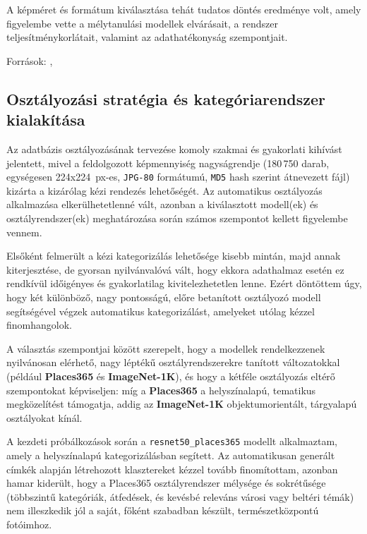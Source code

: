             A képméret és formátum kiválasztása tehát tudatos döntés eredménye volt, amely figyelembe vette a mélytanulási modellek elvárásait, a rendszer teljesítménykorlátait, valamint az adathatékonyság szempontjait.
            
            \begin{flushright}
            \small
            Források: \cite{article_Size_Matters_for_CNN_Classifiers}, \cite{article_Learning_to_Resize_Images_for_Computer_Vision_Tasks}
            \end{flushright}
   
        \subsection{Osztályozási stratégia és kategóriarendszer kialakítása}

            Az adatbázis osztályozásának tervezése komoly szakmai és gyakorlati kihívást jelentett, mivel a feldolgozott képmennyiség nagyságrendje (180\,750 darab, egységesen 224x224~px-es, \texttt{JPG-80} formátumú, \texttt{MD5} hash szerint átnevezett fájl) kizárta a kizárólag kézi rendezés lehetőségét. Az automatikus osztályozás alkalmazása elkerülhetetlenné vált, azonban a kiválasztott modell(ek) és osztályrendszer(ek) meghatározása során számos szempontot kellett figyelembe vennem.
            
            Elsőként felmerült a kézi kategorizálás lehetősége kisebb mintán, majd annak kiterjesztése, de gyorsan nyilvánvalóvá vált, hogy ekkora adathalmaz esetén ez rendkívül időigényes és gyakorlatilag kivitelezhetetlen lenne. Ezért döntöttem úgy, hogy két különböző, nagy pontosságú, előre betanított osztályozó modell segítségével végzek automatikus kategorizálást, amelyeket utólag kézzel finomhangolok. 
            
            A választás szempontjai között szerepelt, hogy a modellek rendelkezzenek nyilvánosan elérhető, nagy léptékű osztályrendszerekre tanított változatokkal (például \textbf{Places365} és \textbf{ImageNet-1K}), és hogy a kétféle osztályozás eltérő szempontokat képviseljen: míg a \textbf{Places365} a helyszínalapú, tematikus megközelítést támogatja, addig az \textbf{ImageNet-1K} objektumorientált, tárgyalapú osztályokat kínál.
            
            A kezdeti próbálkozások során a \texttt{resnet50\_places365} modellt alkalmaztam, amely a helyszínalapú kategorizálásban segített. Az automatikusan generált címkék alapján létrehozott klasztereket kézzel tovább finomítottam, azonban hamar kiderült, hogy a Places365 osztályrendszer mélysége és sokrétűsége (többszintű kategóriák, átfedések, és kevésbé releváns városi vagy beltéri témák) nem illeszkedik jól a saját, főként szabadban készült, természetközpontú fotóimhoz. 
            
